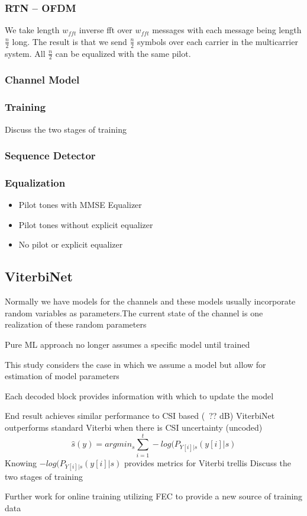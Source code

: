 \documentclass{beamer}
\begin{document}
\begin{frame}
	\frametitle{RTN -- OFDM}
	We take length $w_{fft}$ inverse fft over $w_{fft}$ messages with each message being length $\frac{n}{2}$ long. The
	result is that we send $\frac{n}{2}$ symbols over each carrier in the multicarrier system. All $\frac{n}{2}$ can be
	equalized with the same pilot.
\end{frame}

\begin{frame}
	\frametitle{Channel Model}
	
\end{frame}


\begin{frame}
	\frametitle{Training}
	Discuss the two stages of training
\end{frame}

\begin{frame}
	\frametitle{Sequence Detector}
\end{frame}

\begin{frame}
	\frametitle{Equalization}
	\begin{itemize}
		\item Pilot tones with MMSE Equalizer
		\item Pilot tones without explicit equalizer
		\item No pilot or explicit equalizer
	\end{itemize}
\end{frame}

\subsection{ViterbiNet}



\begin{frame}
Normally we have models for the channels and these models usually incorporate random variables as parameters.The current state of the channel is one realization of these random parameters

Pure ML approach no longer assumes a specific model until trained

This study considers the case in which we assume a model but allow for estimation of model parameters

Each decoded block provides information with which to update the model



	End result achieves similar performance to CSI based (~?? dB)
	ViterbiNet outperforms standard Viterbi when there is CSI uncertainty (uncoded)
\begin{equation}
	\hat{s}(y) = argmin_s\sum_{i=1}^{t}-log(P_{Y[i]|s}(y[i]|s)
\end{equation}
	Knowing $-log(P_{Y[i]|s}(y[i]|s)$ provides metrics for Viterbi trellis
	Discuss the two stages of training

	Further work for online training utilizing FEC to provide a new source of training data
\end{frame}
\end{document}
